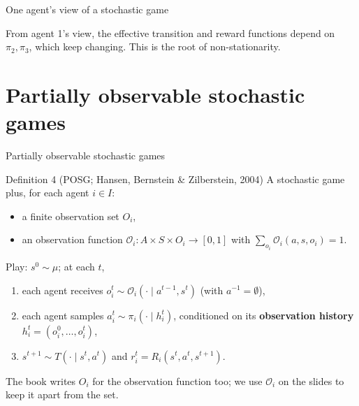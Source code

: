 \documentclass[aspectratio=169,11pt]{beamer}
\begin{document}
\begin{frame}{One agent's view of a stochastic game}
  \centering
  
  \bigskip

  From agent 1's view, the effective transition and reward functions depend on $\pi_2, \pi_3$, which keep changing. This is the root of non-stationarity.
\end{frame}

\section{Partially observable stochastic games}

\begin{frame}{Partially observable stochastic games}
  \begin{block}{Definition 4 (POSG; Hansen, Bernstein \& Zilberstein, 2004)}
    A stochastic game plus, for each agent $i \in I$:
    \begin{itemize}
      \item a finite observation set $O_i$,
      \item an observation function $\mathcal{O}_i : A \times S \times O_i \to [0,1]$ with $\sum_{o_i} \mathcal{O}_i(a, s, o_i) = 1$.
    \end{itemize}
  \end{block}
  Play: $s^0 \sim \mu$; at each $t$,
  \begin{enumerate}
    \item each agent receives $o_i^t \sim \mathcal{O}_i(\cdot \mid a^{t-1}, s^t)$ (with $a^{-1} = \emptyset$),
    \item each agent samples $a_i^t \sim \pi_i(\cdot \mid h_i^t)$, conditioned on its \textbf{observation history} $h_i^t = (o_i^0, \dots, o_i^t)$,
    \item $s^{t+1} \sim T(\cdot \mid s^t, a^t)$ and $r_i^t = R_i(s^t, a^t, s^{t+1})$.
  \end{enumerate}
  \medskip
  \small The book writes $O_i$ for the observation function too; we use $\mathcal{O}_i$ on the slides to keep it apart from the set.
\end{frame}
\end{document}
